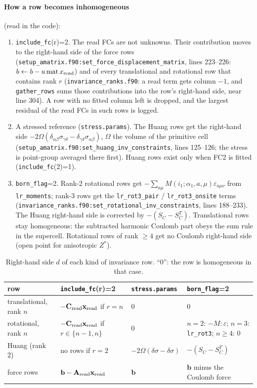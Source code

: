 \documentclass[11pt,a4paper]{article}
\newcommand{\bA}{\mathbf A}
\newcommand{\bC}{\mathbf C}
\newcommand{\bx}{\mathbf x}
\newcommand{\bb}{\mathbf b}
\newcommand{\code}[1]{\texttt{#1}}
\begin{document}
\paragraph{How a row becomes inhomogeneous} (read in the code):
\begin{enumerate}
\item \code{include\_fc}(r)=2. The read FCs are not unknowns. Their contribution moves to the right-hand side of the
force rows (\code{setup\_amatrix.f90:set\_force\_displacement\_matrix}, lines 223--226:
$b\leftarrow b-u\,\mathrm{mat}\,x_{\rm read}$) and of every translational and rotational row that contains rank $r$
(\code{invariance\_ranks.f90}: a read term gets column $-1$, and \code{gather\_rows} sums those contributions into the
row's right-hand side, near line 304). A row with no fitted column left is dropped, and the largest residual of the
read FCs in such rows is logged.
\item A stressed reference (\code{stress.params}). The Huang rows get the right-hand side
$-2\Omega(\delta_{\alpha\beta}\sigma_{\gamma\delta}-\delta_{\gamma\delta}\sigma_{\alpha\beta})$, $\Omega$ the volume of the primitive cell
(\code{setup\_amatrix.f90:set\_huang\_inv\_constraints}, lines 125--126; the stress is point-group averaged there first).
Huang rows exist only when FC2 is fitted (\code{include\_fc}(2)=1).
\item \code{born\_flag}=2. Rank-2 rotational rows get $-\sum_{a\mu}M(i_1;\alpha_1,a,\mu)\varepsilon_{a\mu\nu}$ from \code{lr\_moments};
rank-3 rows get the \code{lr\_rot3\_pair} / \code{lr\_rot3\_onsite} terms
(\code{invariance\_ranks.f90:set\_rotational\_inv\_constraints}, lines 188--233). The Huang right-hand side is corrected by
$-(S_C-S_C^T)$. Translational rows stay homogeneous: the subtracted harmonic Coulomb part obeys the sum rule in the
supercell. Rotational rows of rank $\ge4$ get no Coulomb right-hand side (open point for anisotropic $Z^*$).
\end{enumerate}

\begin{table}[htbp]
\centering
\caption{Right-hand side $d$ of each kind of invariance row. ``0'': the row is homogeneous in that case.}
\label{tab:inhom}
\small
\begin{tabular}{@{}p{2.9cm}p{3.6cm}p{3.1cm}p{4.2cm}@{}}
\toprule
row & \code{include\_fc}(r)=2 & \code{stress.params} & \code{born\_flag}=2\\
\midrule
translational, rank $n$ & $-\bC_{\rm read}\bx_{\rm read}$ if $r=n$ & 0 & 0\\
rotational, rank $n$ & $-\bC_{\rm read}\bx_{\rm read}$ if $r\in\{n-1,n\}$ & 0 & $n=2$: $-M\!:\!\varepsilon$; $n=3$: \code{lr\_rot3}; $n\ge4$: 0\\
Huang (rank 2) & no rows if $r=2$ & $-2\Omega(\delta\sigma-\delta\sigma)$ & $-(S_C-S_C^T)$\\
force rows & $\bb-\bA_{\rm read}\bx_{\rm read}$ & $\bb$ & $\bb$ minus the Coulomb force\\
\bottomrule
\end{tabular}
\end{table}
\end{document}
